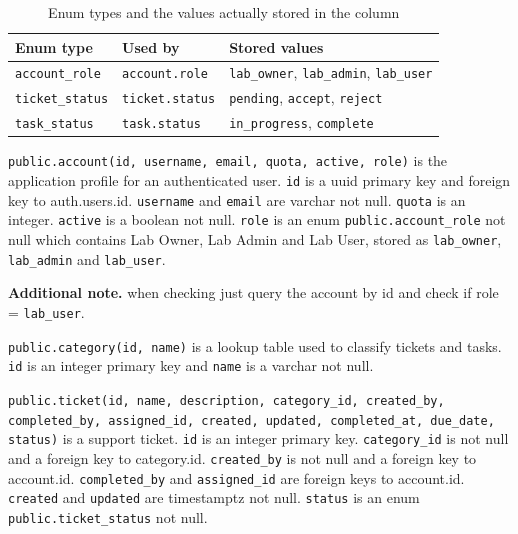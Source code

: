 \documentclass[12pt,letterpaper]{article}
\newenvironment{note}[1][Additional note]
  {\begin{notebox}\noindent\textbf{#1.}\space\ignorespaces}
  {\end{notebox}}
\begin{document}
\begin{table}[H]
  \footnotesize
  \begin{tabularx}{\textwidth}{@{}ll>{\RaggedRight\arraybackslash}X@{}}
    \toprule
    \textbf{Enum type} & \textbf{Used by} & \textbf{Stored values} \\
    \midrule
    \texttt{account\_role} & \texttt{account.role} &
      \texttt{lab\_owner}, \texttt{lab\_admin}, \texttt{lab\_user} \\
    \addlinespace[2pt]
    \texttt{ticket\_status} & \texttt{ticket.status} &
      \texttt{pending}, \texttt{accept}, \texttt{reject} \\
    \addlinespace[2pt]
    \texttt{task\_status} & \texttt{task.status} &
      \texttt{in\_progress}, \texttt{complete} \\
    \bottomrule
  \end{tabularx}
  \caption{Enum types and the values actually stored in the column}
  \label{tab:enums}
\end{table}

\texttt{public.account(id, username, email, quota, active, role)} is the
application profile for an authenticated user. \texttt{id} is a uuid primary
key and foreign key to auth.users.id. \texttt{username} and \texttt{email} are
varchar not null. \texttt{quota} is an integer. \texttt{active} is a boolean
not null. \texttt{role} is an enum \texttt{public.account\_role} not null which
contains Lab Owner, Lab Admin and Lab User, stored as \texttt{lab\_owner},
\texttt{lab\_admin} and \texttt{lab\_user}.

\begin{note}
when checking just query the account by id and check if
role = \texttt{lab\_user}.
\end{note}

\texttt{public.category(id, name)} is a lookup table used to classify tickets
and tasks. \texttt{id} is an integer primary key and \texttt{name} is a varchar
not null.

\texttt{public.ticket(id, name, description, category\_id, created\_by,
completed\_by, assigned\_id, created, updated, completed\_at, due\_date,
status)} is a support ticket. \texttt{id} is an integer primary key.
\texttt{category\_id} is not null and a foreign key to category.id.
\texttt{created\_by} is not null and a foreign key to account.id.
\texttt{completed\_by} and \texttt{assigned\_id} are foreign keys to
account.id. \texttt{created} and \texttt{updated} are timestamptz not null.
\texttt{status} is an enum \texttt{public.ticket\_status} not null.
\end{document}
